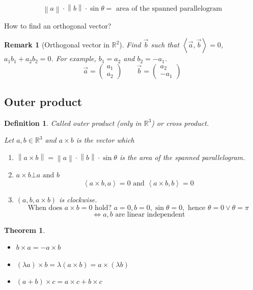 \documentclass{article}
\newtheorem{theorem}{Theorem}  \numberwithin{theorem}{section}
\newtheorem{definition}{Definition}  \numberwithin{definition}{section}
\newtheorem{remark}{Remark}  \numberwithin{remark}{section}
\newcommand{\angel}[1]{\left\langle#1\right\rangle}
\newcommand{\norm}[1]{\left\|#1\right\|}
\newcommand{\rh}[1]{\vec{#1}}
\begin{document}
\[ \norm a \cdot \norm b \cdot \sin\theta = \text{ area of the spanned parallelogram} \]

How to find an orthogonal vector?

\begin{remark}[Orthogonal vector in $\mathbb R^2$]
  Find $\vec{b}$ such that $\angel{\rh{a}, \rh{b}} = 0$, $a_1 b_1 + a_2 b_2 = 0$. For example, $b_1 = a_2$ and $b_2 = -a_1$.
  \[ \rh{a} = \begin{pmatrix} a_1 \\ a_2 \end{pmatrix} \qquad \rh{b} = \begin{pmatrix} a_2 \\ -a_1 \end{pmatrix} \]
\end{remark}

\subsection{Outer product}

\begin{definition} %
  Called \emph{outer product} (only in $\mathbb R^3$) or \emph{cross product}.

  Let $a,b \in \mathbb R^3$ and $a \times b$ is the vector which
  \begin{enumerate}
    \item $\norm{a \times b} = \norm{a} \cdot \norm{b} \cdot \sin{\theta}$ is the area of the spanned parallelogram.
    \item $a \times b \bot a \text{ and } b$
      \[ \angel{a \times b, a} = 0 \text{ and } \angel{a \times b, b} = 0 \]
    \item $(a, b, a \times b)$ is clockwise.
      \[ \text{When does } a \times b = 0 \text{ hold? } a = 0, b = 0, \sin\theta = 0, \text{ hence } \theta = 0 \lor \theta = \pi \]
      \[ \iff a,b \text{ are linear independent} \]
  \end{enumerate}
\end{definition}

\begin{theorem}
  \begin{itemize}
    \item $b \times a = -a \times b$
    \item $(\lambda a) \times b = \lambda (a \times b) = a \times (\lambda b)$
    \item $(a + b) \times c = a \times c + b \times c$
  \end{itemize}
\end{theorem}
\end{document}
